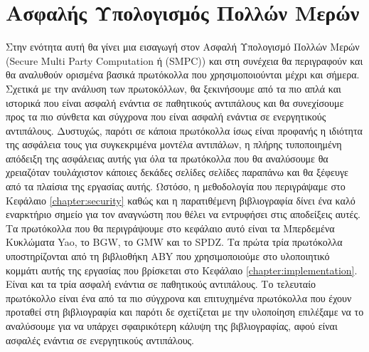 \chapter{Ασφαλής Υπολογισμός Πολλών Μερών}
\label{chapter:SMPC}

Στην ενότητα αυτή θα γίνει μια εισαγωγή στον Ασφαλή Υπολογισμό Πολλών Μερών (Secure Multi Party Computation ή (SMPC)) και στη συνέχεια θα περιγραφούν και θα αναλυθούν ορισμένα βασικά πρωτόκολλα που χρησιμοποιούνται μέχρι και σήμερα. Σχετικά με την ανάλυση των πρωτοκόλλων, θα ξεκινήσουμε από τα πιο απλά και ιστορικά που είναι ασφαλή ενάντια σε παθητικούς αντιπάλους και θα συνεχίσουμε προς τα πιο σύνθετα και σύγχρονα που είναι ασφαλή ενάντια σε ενεργητικούς αντιπάλους. Δυστυχώς, παρότι σε κάποια πρωτόκολλα ίσως είναι προφανής η ιδιότητα της ασφάλεια τους για συγκεκριμένα μοντέλα αντιπάλων, η πλήρης τυποποιημένη απόδειξη της ασφάλειας αυτής για όλα τα πρωτόκολλα που θα αναλύσουμε θα χρειαζόταν τουλάχιστον κάποιες δεκάδες σελίδες σελίδες παραπάνω και θα ξέφευγε από τα πλαίσια της εργασίας αυτής. Ωστόσο, η μεθοδολογία που περιγράψαμε στο Κεφάλαιο \ref{chapter:security} καθώς και η παρατιθέμενη βιβλιογραφία δίνει ένα καλό εναρκτήριο σημείο για τον αναγνώστη που θέλει να εντρυφήσει στις αποδείξεις αυτές. Τα πρωτόκολλα που θα περιγράψουμε στο κεφάλαιο αυτό είναι τα Μπερδεμένα Κυκλώματα Yao, το BGW, το GMW και το SPDZ. Τα πρώτα τρία πρωτόκολλα υποστηρίζονται από τη βιβλιοθήκη ABY που χρησιμοποιούμε στο υλοποιητικό κομμάτι αυτής της εργασίας που βρίσκεται στο Κεφάλαιο \ref{chapter:implementation}. Είναι και τα τρία ασφαλή ενάντια σε παθητικούς αντιπάλους. Το τελευταίο πρωτόκολλο είναι ένα από τα πιο σύγχρονα και επιτυχημένα πρωτόκολλα που έχουν προταθεί στη βιβλιογραφία και παρότι δε σχετίζεται με την υλοποίηση επιλέξαμε να το αναλύσουμε για να υπάρχει σφαιρικότερη κάλυψη της βιβλιογραφίας, αφού είναι ασφαλές ενάντια σε ενεργητικούς αντιπάλους.

